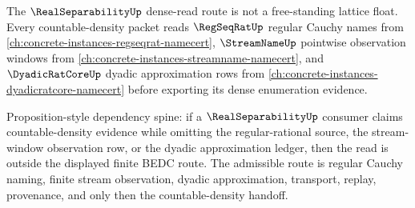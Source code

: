 The $\RealSeparabilityUp$ dense-read route is not a free-standing lattice float. Every countable-density packet reads $\RegSeqRatUp$ regular Cauchy names from \autoref{ch:concrete-instances-regseqrat-namecert}, $\StreamNameUp$ pointwise observation windows from \autoref{ch:concrete-instances-streamname-namecert}, and $\DyadicRatCoreUp$ dyadic approximation rows from \autoref{ch:concrete-instances-dyadicratcore-namecert} before exporting its dense enumeration evidence.

Proposition-style dependency spine: if a $\RealSeparabilityUp$ consumer claims countable-density evidence while omitting the regular-rational source, the stream-window observation row, or the dyadic approximation ledger, then the read is outside the displayed finite BEDC route. The admissible route is regular Cauchy naming, finite stream observation, dyadic approximation, transport, replay, provenance, and only then the countable-density handoff.
